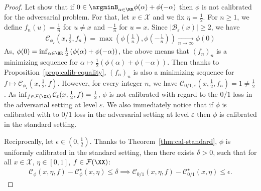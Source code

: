 \begin{proof}

Let show that if $0\in\argminB_{\alpha\in\RR} \phi(\alpha)+\phi(-\alpha)$ then $\phi$ is not calibrated for the adversarial problem. For that, let $x\in\mathcal{X}$ and we fix $\eta = \frac12$.  For $n\geq1$, we define $f_n(u) = \frac1n$ for $u\neq x$ and $-\frac{1}{n}$ for $u=x$.  Since $\lvert\mathcal{B}_\varepsilon(x)\rvert\geq 2$, we have
\begin{align*}
     \mathcal{C}_{\phi_\varepsilon}(x,\frac12,f_n) = \max\left(\phi(\frac1n),\phi(-\frac1n)\right)\xrightarrow[n\to\infty]{} \phi(0) %
\end{align*}
As, $\phi(0) = \inf_{\alpha\in\RR}\frac12\left(\phi(\alpha)+\phi(-\alpha)\right)$, the above means that $(f_n)_n$ is a minimizing sequence for $\alpha \mapsto \frac12 \left(\phi(\alpha)+\phi(-\alpha)\right)$. 
Then thanks to Proposition~\ref{prop:calib-equality}, $(f_n)_n$ is also a minimizing sequence for $f \mapsto\mathcal{C}_{\phi_\varepsilon}(x,\frac12,f)$. However, for every integer $n$, we have $\mathcal{C}_{0/1,\varepsilon}(x,\frac12,f_n) =1\neq\frac12$. As  $\inf_{f\in\mathcal{F}(\XX)}\mathcal{C}_{\varepsilon}(x,\frac12,f)=\frac12$, $\phi$ is not calibrated with regard to the $0/1$ loss in the adversarial setting at level $\varepsilon$. We also immediately notice that if $\phi$ is  calibrated with to  $0/1$ loss in the adversarial setting at level $\varepsilon$ then $\phi$ is calibrated in the standard setting. 


\medskip

Reciprocally, let $\epsilon\in(0,\frac{1}{2})$. Thanks to Theorem~\ref{thm:cal-standard}, $\phi$ is uniformly calibrated in the standard setting, then there exists $\delta>0$, such that for all $x\in\mathcal{X}$, $\eta\in [0,1]$, $f\in \mathcal{F}(\XX)$:
\begin{align*}
    \mathcal{C}_\phi(x,\eta,f) - \mathcal{C}_\phi^\star(x,\eta)\leq \delta \implies \mathcal{C}_{0/1}(x,\eta,f) - \mathcal{C}_{0/1}^\star(x,\eta)\leq \epsilon.
\end{align*}



\end{proof}
